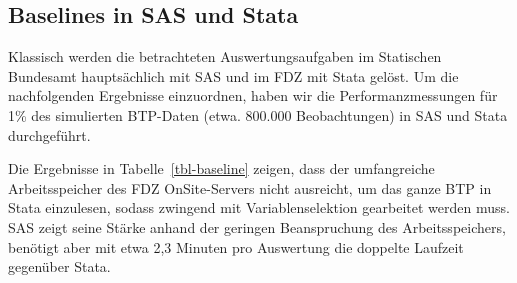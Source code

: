 \documentclass[
  german,
  10pt,
  twoside]{article}
\let\oldref\ref
\renewcommand{\ref}[1]{\oldref{#1}\raisebox{-0.2ex}{\scriptsize\color{wistaBlue}\ding{247}}}
\begin{document}
\subsection{Baselines in SAS und
Stata}\label{baselines-in-sas-und-stata}

Klassisch werden die betrachteten Auswertungsaufgaben im Statischen
Bundesamt hauptsächlich mit SAS und im FDZ mit Stata gelöst. Um die
nachfolgenden Ergebnisse einzuordnen, haben wir die Performanzmessungen
für 1\% des simulierten BTP-Daten (etwa. 800.000 Beobachtungen) in SAS
und Stata durchgeführt.

\begin{table}

\caption{\label{tbl-baseline}Baselines in SAS und Stata (anhand 1\% des simuliertes BTP)}


\end{table}%

Die Ergebnisse in Tabelle~\ref{tbl-baseline} zeigen, dass der
umfangreiche Arbeitsspeicher des FDZ OnSite-Servers nicht ausreicht, um
das ganze BTP in Stata einzulesen, sodass zwingend mit
Variablenselektion gearbeitet werden muss. SAS zeigt seine Stärke anhand
der geringen Beanspruchung des Arbeitsspeichers, benötigt aber mit etwa
2,3 Minuten pro Auswertung die doppelte Laufzeit gegenüber Stata.
\end{document}
